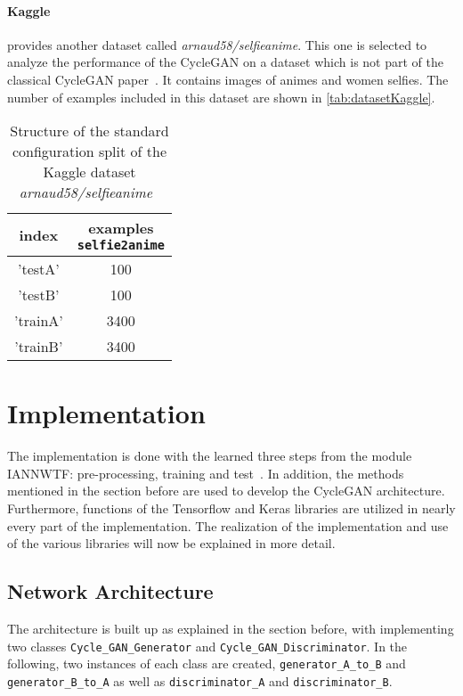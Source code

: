 \documentclass[fleqn,10pt]{SelfArx} %
\begin{document}
\paragraph{Kaggle} provides another dataset called \textit{arnaud58/selfie\-ani\-me}. This one is selected to analyze the performance of the Cycle\ac{GAN} on a dataset which is not part of the classical Cycle\ac{GAN} paper~\cite{image-to-image-ccan}. It contains images of animes and women selfies. The number of examples included in this dataset are shown in \autoref{tab:datasetKaggle}. \cite{kaggle-dataset}

\begin{table}[htb]
\centering
\caption{Structure of the standard configuration split of the Kaggle dataset \textit{arnaud58/selfie\-ani\-me}~\cite{kaggle-dataset}}
\label{tab:datasetKaggle}
\begin{tabular}{c c}
\textbf{index} & \makecell{\textbf{examples} \\ \textbf{\texttt{selfie2anime}}} \\ \hline
'testA' & 100 \\ \hline
'testB' & 100 \\ \hline
'trainA' & 3400 \\ \hline
'trainB' & 3400 \\ \hline
\end{tabular}
\end{table}
\section{Implementation}
The implementation is done with the learned three steps from the module \ac{IANNWTF}: pre-processing, training and test~\cite{implementingANsCourseware02, implementingANsCourseware03}. In addition, the methods mentioned in the section before are used to develop the Cycle\ac{GAN} architecture. Furthermore, functions of the Tensorflow and Keras libraries are utilized in nearly every part of the implementation. The realization of the implementation and use of the various libraries will now be explained in more detail.

\subsection{Network Architecture}
The architecture is built up as explained in the section before, with implementing two classes \texttt{Cycle\_GAN\_Generator} and  \texttt{Cycle\_GAN\_Discriminator}. In the following, two instances of each class are created, \texttt{generator\_A\_to\_B} and \texttt{generator\_B\_to\_A} as well as \texttt{discriminator\_A} and \texttt{discriminator\_B}.
\end{document}
